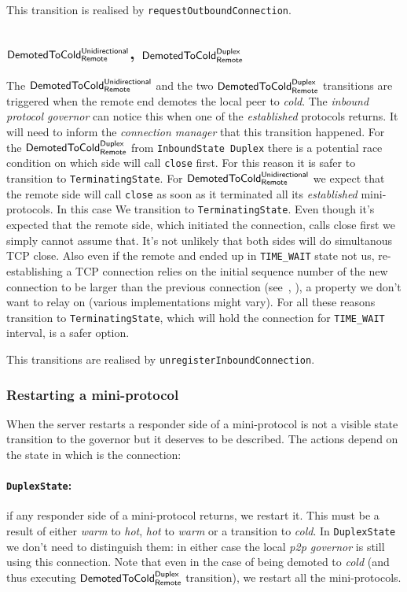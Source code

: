 \documentclass{article}
\def\TCP{\textsf{TCP}}
\def\DuplexState{\texttt{DuplexState}}
\def\InboundStateDup{\texttt{InboundState Duplex}}
\def\TerminatingState{\texttt{TerminatingState}}
\def\DemotedToColdDupRem{$\text{\textsf{DemotedToCold}}^\text{\textsf{Duplex}}_\text{\textsf{Remote}}$}
\def\DemotedToColdUniRem{$\text{\textsf{DemotedToCold}}^\text{\textsf{Unidirectional}}_\text{\textsf{Remote}}$}
\def\cold{\textit{cold}}
\def\warm{\textit{warm}}
\def\hot{\textit{hot}}
\def\established{\textit{established}}
\def\ptopgov{\textit{p2p governor}}
\def\inbgov{\textit{inbound protocol governor}}
\def\connmngr{\textit{connection manager}}
\begin{document}
This transition is realised by \texttt{requestOutboundConnection}.

\subsection{\DemotedToColdUniRem{}, \DemotedToColdDupRem{}}
The \DemotedToColdUniRem{} and the two \DemotedToColdDupRem{} transitions are triggered
when the remote end demotes the local peer to \cold{}.  The \inbgov{} can
notice this when one of the \established{} protocols returns.  It will need to
inform the \connmngr{} that this transition happened.  For the
\DemotedToColdDupRem{} from \InboundStateDup{} there is a potential race
condition on which side will call \texttt{close} first.  For this reason it is
safer to transition to \TerminatingState{}.  For \DemotedToColdUniRem{} we
expect that the remote side will call \texttt{close} as soon as it terminated
all its \established{} mini-protocols.  In this case We transition to
\TerminatingState{}.  Even though it's expected that the remote side, which
initiated the connection, calls close first we simply cannot assume
that.  It's not unlikely that both sides will do simultanous \TCP{} close.
Also even if the remote and ended up in \texttt{TIME\_WAIT} state not us,
re-establishing a \TCP{} connection relies on the initial sequence number of
the new connection to be larger than the previous connection (see~\cite[Chapter
2, \texttt{TIME\_WAIT} section]{stevens2003unix}, \cite[Section
4.2.2.13]{RFC1122}), a property we don't want to relay on (various
implementations might vary). For all these reasons transition to
\TerminatingState{,} which will hold the connection for \texttt{TIME\_WAIT}
interval, is a safer option.

This transitions are realised by \texttt{unregisterInboundConnection}.

\subsubsection{Restarting a mini-protocol}
When the server restarts a responder side of a mini-protocol is not a visible
state transition to the governor but it deserves to be described.  The actions
depend on the state in which is the connection:

\paragraph{\DuplexState{}:}
if any responder side of a mini-protocol returns, we
restart it.  This must be a result of either \warm{} to \hot{}, \hot{} to
\warm{} or a transition to \cold{}.  In \DuplexState{} we don't need to
distinguish them: in either case the local \ptopgov{} is still using this
connection.  Note that even in the case of being demoted to \cold{} (and thus
executing \DemotedToColdDupRem{} transition), we restart all the
mini-protocols.
\end{document}

